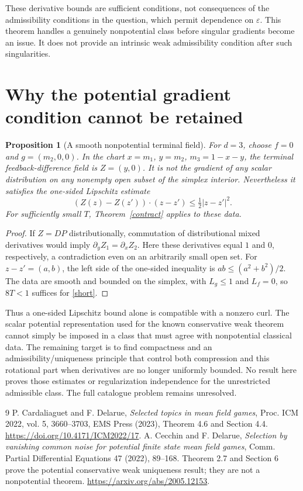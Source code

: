 \documentclass[11pt]{article}
\newtheorem{proposition}[theorem]{Proposition}
\begin{document}
These derivative bounds are sufficient conditions, not consequences of the admissibility conditions in the question, which permit dependence on $\varepsilon$. This theorem handles a genuinely nonpotential class before singular gradients become an issue. It does not provide an intrinsic weak admissibility condition after such singularities.

\section{Why the potential gradient condition cannot be retained}
\begin{proposition}[A smooth nonpotential terminal field]\label{curl}
For $d=3$, choose $f=0$ and $g=(m_2,0,0)$. In the chart $x=m_1$, $y=m_2$, $m_3=1-x-y$, the terminal feedback-difference field is $Z=(y,0)$. It is not the gradient of any scalar distribution on any nonempty open subset of the simplex interior. Nevertheless it satisfies the one-sided Lipschitz estimate
\[
 (Z(z)-Z(z'))\cdot(z-z')\le\tfrac12|z-z'|^2.
\]
For sufficiently small $T$, Theorem~\ref{contract} applies to these data.
\end{proposition}
\begin{proof}
If $Z=DP$ distributionally, commutation of distributional mixed derivatives would imply $\partial_yZ_1=\partial_xZ_2$. Here these derivatives equal $1$ and $0$, respectively, a contradiction even on an arbitrarily small open set. For $z-z'=(a,b)$, the left side of the one-sided inequality is $ab\le(a^2+b^2)/2$. The data are smooth and bounded on the simplex, with $L_g\le1$ and $L_f=0$, so $8T<1$ suffices for \eqref{short}.
\end{proof}

Thus a one-sided Lipschitz bound alone is compatible with a nonzero curl. The scalar potential representation used for the known conservative weak theorem cannot simply be imposed in a class that must agree with nonpotential classical data. The remaining target is to find compactness and an admissibility/uniqueness principle that control both compression and this rotational part when derivatives are no longer uniformly bounded. No result here proves those estimates or regularization independence for the unrestricted admissible class. The full catalogue problem remains unresolved.

\begin{thebibliography}{9}
 P. Cardaliaguet and F. Delarue, \emph{Selected topics in mean field games}, Proc. ICM 2022, vol. 5, 3660--3703, EMS Press (2023), Theorem 4.6 and Section 4.4. \url{https://doi.org/10.4171/ICM2022/17}.
 A. Cecchin and F. Delarue, \emph{Selection by vanishing common noise for potential finite state mean field games}, Comm. Partial Differential Equations 47 (2022), 89--168. Theorem 2.7 and Section 6 prove the potential conservative weak uniqueness result; they are not a nonpotential theorem. \url{https://arxiv.org/abs/2005.12153}.
\end{thebibliography}
\end{document}

